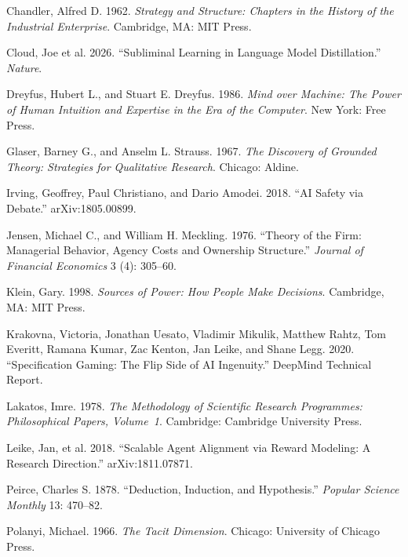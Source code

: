 \documentclass[
  11pt,
]{article}
\newlength{\cslhangindent}
\newenvironment{CSLReferences}[2] %
 {\begin{list}{}{%
  \setlength{\itemindent}{0pt}
  \setlength{\leftmargin}{0pt}
  \setlength{\parsep}{0pt}
  \ifodd #1
   \setlength{\leftmargin}{\cslhangindent}
   \setlength{\itemindent}{-1\cslhangindent}
  \fi
  \setlength{\itemsep}{#2\baselineskip}}}
 {\end{list}}
\begin{document}
\begin{CSLReferences}{1}{0}
Chandler, Alfred D. 1962. \emph{Strategy and Structure: Chapters in the
History of the Industrial Enterprise}. Cambridge, MA: MIT Press.

Cloud, Joe et al. 2026. {``Subliminal Learning in Language Model
Distillation.''} \emph{Nature}.

Dreyfus, Hubert L., and Stuart E. Dreyfus. 1986. \emph{Mind over Machine:
The Power of Human Intuition and Expertise in the Era of the Computer}.
New York: Free Press.

Glaser, Barney G., and Anselm L. Strauss. 1967. \emph{The Discovery of
Grounded Theory: Strategies for Qualitative Research}. Chicago: Aldine.

Irving, Geoffrey, Paul Christiano, and Dario Amodei. 2018. {``{AI} Safety
via Debate.''} arXiv:1805.00899.

Jensen, Michael C., and William H. Meckling. 1976. {``Theory of the
Firm: Managerial Behavior, Agency Costs and Ownership Structure.''}
\emph{Journal of Financial Economics} 3 (4): 305--60.

Klein, Gary. 1998. \emph{Sources of Power: How People Make Decisions}.
Cambridge, MA: MIT Press.

Krakovna, Victoria, Jonathan Uesato, Vladimir Mikulik, Matthew Rahtz,
Tom Everitt, Ramana Kumar, Zac Kenton, Jan Leike, and Shane Legg. 2020.
{``Specification Gaming: The Flip Side of {AI} Ingenuity.''} DeepMind
Technical Report.

Lakatos, Imre. 1978. \emph{The Methodology of Scientific Research
Programmes: Philosophical Papers, Volume~1}. Cambridge: Cambridge
University Press.

Leike, Jan, et al. 2018. {``Scalable Agent Alignment via Reward Modeling:
A Research Direction.''} arXiv:1811.07871.

Peirce, Charles S. 1878. {``Deduction, Induction, and Hypothesis.''}
\emph{Popular Science Monthly} 13: 470--82.

Polanyi, Michael. 1966. \emph{The Tacit Dimension}. Chicago: University
of Chicago Press.


\end{CSLReferences}
\end{document}
